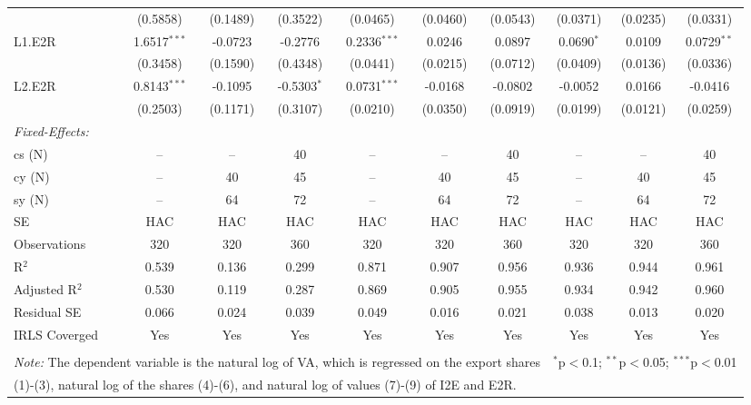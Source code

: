 \documentclass[a4paper]{article}
\begin{document}
\begin{table}[h!]
{\begin{tabular}[t]{lccccccccc}
  & (0.5858) & (0.1489) & (0.3522) & (0.0465) & (0.0460) & (0.0543) & (0.0371) & (0.0235) & (0.0331) \\ 
 L1.E2R & 1.6517$^{***}$ & -0.0723 & -0.2776 & 0.2336$^{***}$ & 0.0246 & 0.0897 & 0.0690$^{*}$ & 0.0109 & 0.0729$^{**}$ \\ 
  & (0.3458) & (0.1590) & (0.4348) & (0.0441) & (0.0215) & (0.0712) & (0.0409) & (0.0136) & (0.0336) \\ 
 L2.E2R & 0.8143$^{***}$ & -0.1095 & -0.5303$^{*}$ & 0.0731$^{***}$ & -0.0168 & -0.0802 & -0.0052 & 0.0166 & -0.0416 \\ 
  & (0.2503) & (0.1171) & (0.3107) & (0.0210) & (0.0350) & (0.0919) & (0.0199) & (0.0121) & (0.0259) \\ 
\midrule \emph{Fixed-Effects:} &   &   &   &   &   &  \\
cs (N) & -- & -- & 40 & -- & -- & 40 & -- & -- & 40\\
cy (N) & -- & 40 & 45 & -- & 40 & 45 & -- & 40 & 45\\
sy (N) & -- & 64 & 72 & -- & 64 & 72 & -- & 64 & 72\\
\midrule
SE & HAC & HAC & HAC &HAC &HAC &HAC &HAC &HAC &HAC \\
Observations & 320 & 320 & 360 & 320 & 320 & 360 & 320 & 320 & 360 \\ 
R$^{2}$ & 0.539 & 0.136 & 0.299 & 0.871 & 0.907 & 0.956 & 0.936 & 0.944 & 0.961 \\ 
Adjusted R$^{2}$ & 0.530 & 0.119 & 0.287 & 0.869 & 0.905 & 0.955 & 0.934 & 0.942 & 0.960 \\ 
Residual SE & 0.066 & 0.024 & 0.039 & 0.049 & 0.016 & 0.021 & 0.038 & 0.013 & 0.020 \\ 
IRLS Coverged & Yes & Yes & Yes & Yes & Yes & Yes & Yes & Yes & Yes \\ \bottomrule \\[-1em]
\multicolumn{7}{l}{\small \textit{Note:} The dependent variable is the natural log of VA, which is regressed on the  export shares}   & \multicolumn{3}{r}{$^{*}$p$<$0.1; $^{**}$p$<$0.05; $^{***}$p$<$0.01} \\ [-0.2em]
\multicolumn{10}{l}{\small \quad \quad \quad (1)-(3), natural log of the shares (4)-(6), and natural log of values (7)-(9) of I2E and E2R.} \\
\end{tabular} 
}
\end{table} 
\FloatBarrier
\end{document}
